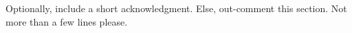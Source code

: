 \documentclass[graybox,natbib,nosecnum]{svmult}
\newcommand*\aap{A\&A}
\begin{document}
\begin{acknowledgement}
Optionally, include a short acknowledgment.  Else, out-comment this section. Not more than a few lines please.
\end{acknowledgement}


\end{document}
